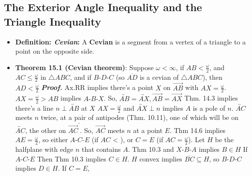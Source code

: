 \documentclass{report}
\begin{document}
    \subsection{The Exterior Angle Inequality and the Triangle Inequality}
    \begin{itemize}
        \item \textbf{Definition: \textit{Cevian}:} A \textbf{Cevian} is a segment from a vertex of a triangle to a point on the opposite side.
            \bigbreak \noindent 
        \item \textbf{Theorem 15.1 (Cevian theorem)}: Suppose $\omega < \infty$, if $AB < \frac{\omega}{2}$, and $AC \leq \frac{\omega}{2}$ in $\triangle ABC$, and if $ B\text{-}D\text{-}C $ (so $\overline{AD} $ is a cevian of $\triangle ABC$), then $AD < \frac{\omega}{2}$
            \bigbreak \noindent 
            \bigbreak \noindent 
            \bigbreak \noindent 
            \textbf{\textit{Proof.}} Ax.RR implies there's a point $X$ on $\overrightarrow{AB}$ with $AX  = \frac{\omega}{2}$. $AX = \frac{\omega}{2} > AB$ implies $ A\text{-}B\text{-}X$. So, $ \overleftrightarrow{AB} = \overleftrightarrow{AX} , \overrightarrow{AB} = \overrightarrow{AX}$
            \bigbreak \noindent 
            Thm. 14.3 implies there's a line $ n \perp \overleftrightarrow{AB} $ at $X$
            \bigbreak \noindent 
            \bigbreak \noindent 
            $AX =\frac{\omega}{2}$ and $ \overleftrightarrow{AX} \perp n$ implies $A$ is a pole of $n$. $\overleftrightarrow{AC}$ meets $n$ twice, at a pair of antipodes (Thm. 10.11), one of which will be on $\overleftrightarrow{AC}$, the other on $ \overrightarrow{AC}^{\prime}$. So, $\overrightarrow{AC}$ meets $n$ at a point $E$. 
            \bigbreak \noindent 
            Thm 14.6 implies $AE = \frac{\omega}{2}$, so either $ A\text{-}C\text{-}E $ (if $AC$ < ), or $C = E$ (if $AC = \frac{\omega}{2}$).
            \bigbreak \noindent 
            Let $H$ be the halfplane with edge $n$ that contains $A$. Thm 10.3 and $ X\text{-}B\text{-}A $ implies $ B \in H$
            \bigbreak \noindent 
            If $ A\text{-}C\text{-}E $
            \bigbreak \noindent 
            \bigbreak \noindent 
            Then Thm 10.3 implies $ C \in H$. $H$ convex implies $ \overline{BC} \subseteq H $, so $ B\text{-}D\text{-}C$ implies $ D \in H$.
            \bigbreak \noindent 
            If $C = E$, 

\end{itemize}
\end{document}
